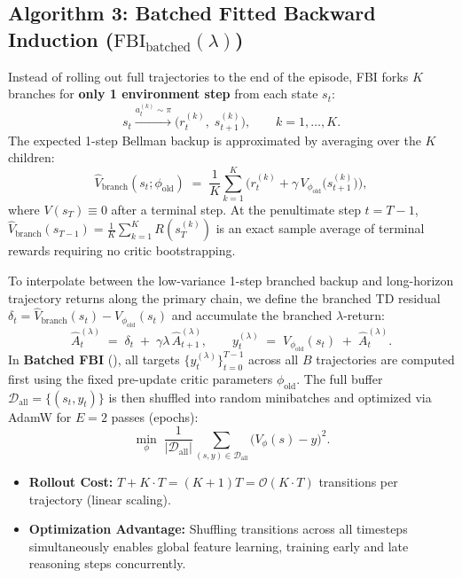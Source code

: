 \documentclass[11pt,a4paper]{article}
\begin{document}
\subsection{\texorpdfstring{Algorithm 3: Batched Fitted Backward Induction ($\text{FBI}_{\text{batched}}(\lambda)$)}{Algorithm 3: Batched Fitted Backward Induction (FBI batched)}}
Instead of rolling out full trajectories to the end of the episode, FBI forks $K$ branches for \textbf{only 1 environment step} from each state $s_t$:
\[
    s_t \xrightarrow{a_t^{(k)} \sim \pi} \big(r_t^{(k)},\; s_{t+1}^{(k)}\big), \qquad k = 1, \dots, K.
\]
The expected 1-step Bellman backup is approximated by averaging over the $K$ children:
\[
    \hat{V}_{\text{branch}}(s_t; \phi_{\text{old}}) \;=\; \frac{1}{K}\sum_{k=1}^K \Big( r_t^{(k)} + \gamma \, V_{\phi_{\text{old}}}\big(s_{t+1}^{(k)}\big) \Big),
\]
where $V(s_T) \equiv 0$ after a terminal step. At the penultimate step $t = T-1$, $\hat{V}_{\text{branch}}(s_{T-1}) = \frac{1}{K}\sum_{k=1}^K R(s_T^{(k)})$ is an exact sample average of terminal rewards requiring no critic bootstrapping.

To interpolate between the low-variance 1-step branched backup and long-horizon trajectory returns along the primary chain, we define the branched TD residual $\delta_t = \hat{V}_{\text{branch}}(s_t) - V_{\phi_{\text{old}}}(s_t)$ and accumulate the branched $\lambda$-return:
\[
    \hat{A}_t^{(\lambda)} \;=\; \delta_t \;+\; \gamma \lambda \, \hat{A}_{t+1}^{(\lambda)}, \qquad
    y_t^{(\lambda)} \;=\; V_{\phi_{\text{old}}}(s_t) \;+\; \hat{A}_t^{(\lambda)}.
\]
In \textbf{Batched FBI} (), all targets $\{y_t^{(\lambda)}\}_{t=0}^{T-1}$ across all $B$ trajectories are computed first using the fixed pre-update critic parameters $\phi_{\text{old}}$. The full buffer $\mathcal{D}_{\text{all}} = \{(s_t, y_t)\}$ is then shuffled into random minibatches and optimized via AdamW for $E = 2$ passes (epochs):
\[
    \min_\phi \; \frac{1}{|\mathcal{D}_{\text{all}}|} \sum_{(s, y) \in \mathcal{D}_{\text{all}}} \big( V_\phi(s) - y \big)^2.
\]
\begin{itemize}[leftmargin=*, itemsep=1.5pt]
    \item \textbf{Rollout Cost:} $T + K \cdot T = (K+1)T = \mathcal{O}(K \cdot T)$ transitions per trajectory (linear scaling).
    \item \textbf{Optimization Advantage:} Shuffling transitions across all timesteps simultaneously enables global feature learning, training early and late reasoning steps concurrently.
\end{itemize}
\end{document}
